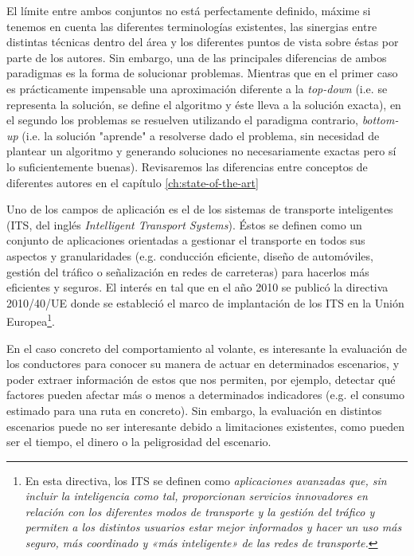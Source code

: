 El límite entre ambos conjuntos no está perfectamente definido, máxime si tenemos en cuenta las diferentes terminologías existentes, las sinergias entre distintas técnicas dentro del área y los diferentes puntos de vista sobre éstas por parte de los autores. Sin embargo, una de las principales diferencias de ambos paradigmas es la forma de solucionar problemas. Mientras que en el primer caso es prácticamente impensable una aproximación diferente a la \textit{top-down} (i.e. se representa la solución, se define el algoritmo y éste lleva a la solución exacta), en el segundo los problemas se resuelven utilizando el paradigma contrario, \textit{bottom-up} (i.e. la solución "aprende" a resolverse dado el problema, sin necesidad de plantear un algoritmo y generando soluciones no necesariamente exactas pero sí lo suficientemente buenas). Revisaremos las diferencias entre conceptos de diferentes autores en el capítulo \ref{ch:state-of-the-art}

Uno de los campos de aplicación es el de los sistemas de transporte inteligentes (ITS, del inglés \textit{Intelligent Transport Systems}). Éstos se definen como un conjunto de aplicaciones orientadas a gestionar el transporte en todos sus aspectos y granularidades (e.g. conducción eficiente, diseño de automóviles, gestión del tráfico o señalización en redes de carreteras) para hacerlos más eficientes y seguros. El interés en tal que en el año 2010 se publicó la directiva 2010/40/UE\cite{parliament2010directive} donde se estableció el marco de implantación de los ITS en la Unión Europea\footnote{En esta directiva, los ITS se definen como \textit{aplicaciones avanzadas que, sin incluir la inteligencia como tal, proporcionan servicios innovadores en relación con los diferentes modos de transporte y la gestión del tráfico y permiten a los distintos usuarios estar mejor informados y hacer un uso más seguro, más coordinado y «más inteligente» de las redes de transporte.}}.

En el caso concreto del comportamiento al volante, es interesante la evaluación de los conductores para conocer su manera de actuar en determinados escenarios, y poder extraer información de estos que nos permiten, por ejemplo, detectar qué factores pueden afectar más o menos a determinados indicadores (e.g. el consumo estimado para una ruta en concreto). Sin embargo, la evaluación en distintos escenarios puede no ser interesante debido a limitaciones existentes, como pueden ser el tiempo, el dinero o la peligrosidad del escenario.

